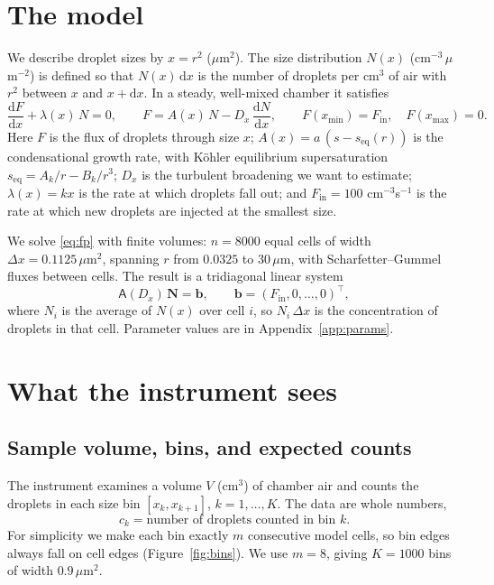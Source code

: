 \documentclass[11pt]{article}
\newcommand{\um}{\,\mu\mathrm{m}}
\newcommand{\A}{\mathsf{A}}
\newcommand{\N}{\mathbf{N}}
\newcommand{\Fin}{F_{\mathrm{in}}}
\newcommand{\seq}{s_{\mathrm{eq}}}
\newcommand{\dd}{\mathrm{d}}
\begin{document}
\section{The model}\label{sec:model}
We describe droplet sizes by $x = r^2$ ($\mu$m$^2$). The size distribution $N(x)$ (cm$^{-3}\,\mu$m$^{-2}$) is defined so that $N(x)\,\dd x$ is the number of droplets per cm$^3$ of air with $r^2$ between $x$ and $x+\dd x$. In a steady, well-mixed chamber it satisfies
\begin{equation}\label{eq:fp}
\frac{\dd F}{\dd x} + \lambda(x)\,N = 0,\qquad F = A(x)\,N - D_x\,\frac{\dd N}{\dd x},\qquad F(x_{\min}) = \Fin,\quad F(x_{\max}) = 0 .
\end{equation}
Here $F$ is the flux of droplets through size $x$; $A(x) = a\,(s - \seq(r))$ is the condensational growth rate, with Köhler equilibrium supersaturation $\seq = A_k/r - B_k/r^3$; $D_x$ is the turbulent broadening we want to estimate; $\lambda(x) = kx$ is the rate at which droplets fall out; and $\Fin = 100$ cm$^{-3}$s$^{-1}$ is the rate at which new droplets are injected at the smallest size.

We solve \eqref{eq:fp} with finite volumes: $n = 8000$ equal cells of width $\Delta x = 0.1125\um^2$, spanning $r$ from $0.0325$ to $30\um$, with Scharfetter--Gummel fluxes between cells. The result is a tridiagonal linear system
\begin{equation}\label{eq:system}
\A(D_x)\,\N = \mathbf{b},\qquad \mathbf{b} = (\Fin,0,\dots,0)^\top,
\end{equation}
where $N_i$ is the average of $N(x)$ over cell $i$, so $N_i\,\Delta x$ is the concentration of droplets in that cell. Parameter values are in Appendix~\ref{app:params}.

\section{What the instrument sees}\label{sec:obs}
\subsection{Sample volume, bins, and expected counts}
The instrument examines a volume $V$ (cm$^3$) of chamber air and counts the droplets in each size bin $[x_k, x_{k+1}]$, $k = 1,\dots,K$. The data are whole numbers,
\[
c_k = \text{number of droplets counted in bin } k .
\]
For simplicity we make each bin exactly $m$ consecutive model cells, so bin edges always fall on cell edges (Figure~\ref{fig:bins}). We use $m = 8$, giving $K = 1000$ bins of width $0.9\um^2$.
\end{document}

